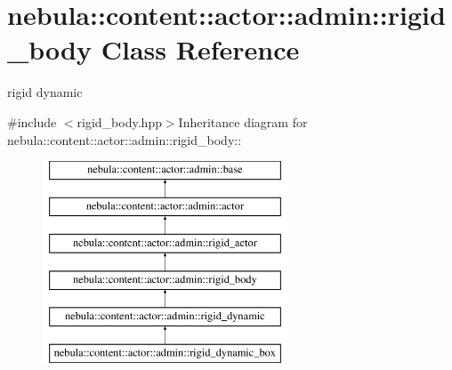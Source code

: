 \hypertarget{classnebula_1_1content_1_1actor_1_1admin_1_1rigid__body}{
\section{nebula::content::actor::admin::rigid\_\-body Class Reference}
\label{classnebula_1_1content_1_1actor_1_1admin_1_1rigid__body}
}


rigid dynamic  


{\ttfamily \#include $<$rigid\_\-body.hpp$>$}Inheritance diagram for nebula::content::actor::admin::rigid\_\-body::\begin{figure}[H]
\begin{center}
\leavevmode
\includegraphics[height=6cm]{classnebula_1_1content_1_1actor_1_1admin_1_1rigid__body}
\end{center}
\end{figure}
